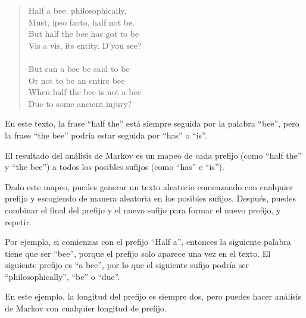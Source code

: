 \documentclass[10pt]{book}
\begin{document}
\begin{quote}
Half a bee, philosophically, \\
Must, ipso facto, half not be. \\
But half the bee has got to be \\
Vis a vis, its entity. D'you see? \\
\\
But can a bee be said to be \\
Or not to be an entire bee \\
When half the bee is not a bee \\
Due to some ancient injury? \\
\end{quote}
%
En este texto,
la frase ``half the'' está siempre seguida por la palabra ``bee'',
pero la frase ``the bee'' podría estar seguida por
``has'' o ``is''.

El resultado del análisis de Markov es un mapeo de cada prefijo
(como ``half the'' y ``the bee'') a todos los posibles sufijos
(como ``has'' e ``is'').

Dado este mapeo, puedes generar un texto aleatorio
comenzando con cualquier prefijo y escogiendo de manera aleatoria
en los posibles sufijos.  Después, puedes combinar el final del
prefijo y el nuevo sufijo para formar el nuevo prefijo, y repetir.

Por ejemplo, si comienzas con el prefijo ``Half a'', entonces la
siguiente palabra tiene que ser ``bee'', porque el prefijo solo aparece
una vez en el texto.  El siguiente prefijo es ``a bee'', por lo que el
siguiente sufijo podría ser ``philosophically'', ``be'' o ``due''.

En este ejemplo, la longitud del prefijo es siempre dos, pero
puedes hacer análisis de Markov con cualquier longitud de prefijo.
\end{document}
